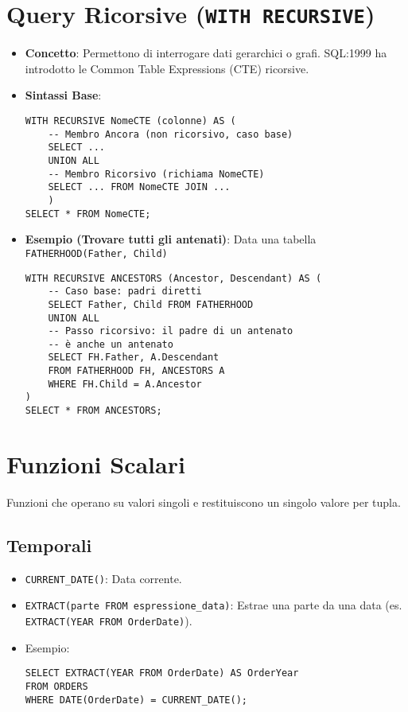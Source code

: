 	\section{Query Ricorsive (\texttt{WITH RECURSIVE})}
	\begin{itemize}
		\item \textbf{Concetto}: Permettono di interrogare dati gerarchici o grafi. SQL:1999 ha introdotto le Common Table Expressions (CTE) ricorsive.
		\item \textbf{Sintassi Base}:
		\begin{verbatim}
WITH RECURSIVE NomeCTE (colonne) AS (
	-- Membro Ancora (non ricorsivo, caso base)
	SELECT ...
	UNION ALL
	-- Membro Ricorsivo (richiama NomeCTE)
	SELECT ... FROM NomeCTE JOIN ...
	)
SELECT * FROM NomeCTE;
		\end{verbatim}
		\item \textbf{Esempio (Trovare tutti gli antenati)}: Data una tabella \texttt{FATHERHOOD(Father, Child)}
		\begin{verbatim}
WITH RECURSIVE ANCESTORS (Ancestor, Descendant) AS (
	-- Caso base: padri diretti
	SELECT Father, Child FROM FATHERHOOD
	UNION ALL
	-- Passo ricorsivo: il padre di un antenato
	-- è anche un antenato
	SELECT FH.Father, A.Descendant
	FROM FATHERHOOD FH, ANCESTORS A
	WHERE FH.Child = A.Ancestor
)
SELECT * FROM ANCESTORS;
		\end{verbatim}
	\end{itemize}
	
	\section{Funzioni Scalari}
	Funzioni che operano su valori singoli e restituiscono un singolo valore per tupla.
	
	\subsection{Temporali}
	\begin{itemize}
		\item \texttt{CURRENT\_DATE()}: Data corrente.
		\item \texttt{EXTRACT(parte FROM espressione\_data)}: Estrae una parte da una data (es. \texttt{EXTRACT(YEAR FROM OrderDate)}).
		\item Esempio:
		\begin{verbatim}
SELECT EXTRACT(YEAR FROM OrderDate) AS OrderYear
FROM ORDERS
WHERE DATE(OrderDate) = CURRENT_DATE();
		\end{verbatim}
	\end{itemize}
	
